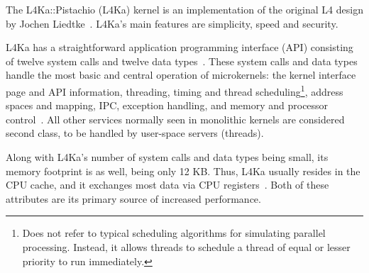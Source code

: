 
The L4Ka::Pistachio (L4Ka) kernel is an implementation of the original
L4 design by Jochen Liedtke~\cite{herder2005}.  L4Ka's main features are
simplicity, speed and security.

L4Ka has a straightforward application programming interface (API)
consisting of twelve system calls and twelve data types~\cite{l4ref2005}.
These system calls and data types handle the most
basic and central operation of microkernels: the kernel interface page
and API information, threading, timing and thread
scheduling\footnote{Does not refer to typical scheduling algorithms for
simulating parallel processing.  Instead, it allows threads to schedule a
thread of equal or lesser priority to run immediately.}, address
spaces and mapping, IPC, exception handling, and memory and processor
control~\cite{l4ref2005}.  All other services normally seen in monolithic
kernels are considered second class, to be handled by user-space
servers (threads).

Along with L4Ka's number of system calls and data types being small, its
memory footprint is as well, being only 12 KB.  Thus, L4Ka usually
resides in the CPU cache, and it exchanges most data via CPU
registers~\cite{l4ref2005}.  Both of these attributes are its primary source
of increased performance.
